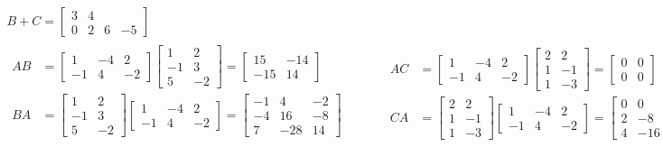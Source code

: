 \documentclass[twoside]{amsart}
\theoremstyle{plain}
\theoremstyle{definition}
\begin{document}
\[
\begin{gathered}
  B+ C = \left[ \begin{matrix} 3 & 4 \\ 0 & 2 & 6 & -5 \end{matrix} \right] \\
  \begin{aligned}
    AB & = \left[ \begin{matrix} 1 & -4 & 2 \\ -1 & 4 & -2 \end{matrix} \right] \left[ \begin{matrix} 1 & 2 \\ -1 & 3 \\ 5 & -2 \end{matrix} \right] = \left[ \begin{matrix} 15 & - 14 \\ -15 & 14 \end{matrix} \right] \\
    BA & = \left[ \begin{matrix} 1 & 2 \\ -1 & 3 \\ 5 & -2 \end{matrix} \right] \left[ \begin{matrix} 1 & -4 & 2 \\ -1 & 4 & -2 \end{matrix} \right] = \left[ \begin{matrix} -1 & 4 & -2 \\ -4 & 16 & -8 \\ 7 & -28 & 14 \end{matrix} \right] \\
    \end{aligned} \quad \quad \quad 
  \begin{aligned}
    AC & = \left[ \begin{matrix} 1 & -4 & 2 \\ 
	-1 & 4 & -2 \end{matrix} \right] \left[ \begin{matrix} 2 & 2 \\
	 1 & -1 \\
	 1 & -3 \end{matrix} \right] = \left[ \begin{matrix} 0 & 0 \\ 0 & 0 \end{matrix} \right] \\
    CA & = \left[ \begin{matrix} 2 & 2 \\ 1 & -1 \\ 1 & -3 \end{matrix} \right] \left[ \begin{matrix} 1 & -4 & 2 \\ -1 & 4 & -2 \end{matrix} \right] = \left[ \begin{matrix} 0 & 0 & 0 \\ 2 & -8 & 4 \\ 4 & - 16 & 8 \end{matrix} \right]

\end{aligned}
\end{gathered}\]
\end{document}
